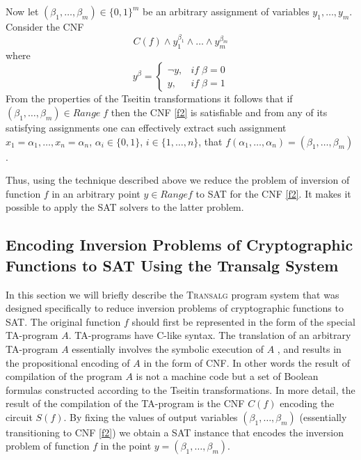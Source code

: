 \documentclass[runningheads,a4paper]{llncs}
\begin{document}
Now let $\left(\beta_1,\ldots,\beta_m\right)\in\{0,1\}^m$ be an arbitrary assignment of variables $y_1,\ldots,y_m$. Consider the CNF
\begin{equation}
\label{f2}
C(f)\wedge y_1^{\beta_1}\wedge\ldots\wedge y_m^{\beta_m}
\end{equation}
where 
\begin{equation*}
y^{\beta}=\left\{
\begin{array}{cc}
\neg y,& if \;\beta=0\\
y,& if\;\beta=1
\end{array}
\right.
\end{equation*}
From the properties of the Tseitin transformations it follows that if $\left(\beta_1,\ldots,\beta_m\right)\in Range\;f$ then the CNF \eqref{f2} is satisfiable and from any of its satisfying assignments one can effectively extract such assignment $x_1=\alpha_1,\ldots,x_n=\alpha_n$, $\alpha_i\in\{0,1\}$, $i\in \{1,\ldots,n\}$, that $f\left(\alpha_1,\ldots,\alpha_n\right)=\left(\beta_1,\ldots,\beta_m\right)$.

Thus, using the technique described above we reduce the problem of inversion of function $f$ in an arbitrary point $y\in Range f$ to SAT for the CNF \eqref{f2}. It makes it possible to apply the SAT solvers to the latter problem.

\subsection{Encoding Inversion Problems of Cryptographic Functions to SAT Using the \textbf{Transalg} System}

In this section we will briefly describe the \textsc{Transalg} program system \cite{DBLP:journals/corr/OtpuschennikovSK14} that was designed specifically to reduce inversion problems of cryptographic functions to SAT. The original function $f$ should first be represented in the form of the special TA-program $A$. TA-programs have C-like syntax. The translation of an arbitrary TA-program $A$ essentially involves the symbolic execution of $A$ \cite{King:1976:SEP:360248.360252}, and results in the propositional encoding of $A$ in the form of CNF. In other words the result of compilation of the program $A$ is not a machine code but a set of Boolean formulas constructed according to the Tseitin transformations. In more detail, the result of the compilation of the TA-program is the CNF $C(f)$ encoding the circuit $S(f)$. By fixing the values of output variables $\left(\beta_1,\ldots,\beta_m\right)$ (essentially transitioning to CNF \eqref{f2}) we obtain a SAT instance that encodes the inversion problem of function $f$ in the point $y=\left(\beta_1,\ldots,\beta_m\right)$.
\end{document}
